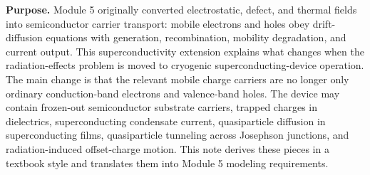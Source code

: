 \documentclass[11pt]{article}
\begin{document}

\begin{overviewbox}
\textbf{Purpose.} Module 5 originally converted electrostatic, defect, and thermal fields into semiconductor carrier transport: mobile electrons and holes obey drift-diffusion equations with generation, recombination, mobility degradation, and current output. This superconductivity extension explains what changes when the radiation-effects problem is moved to cryogenic superconducting-device operation. The main change is that the relevant mobile charge carriers are no longer only ordinary conduction-band electrons and valence-band holes. The device may contain frozen-out semiconductor substrate carriers, trapped charges in dielectrics, superconducting condensate current, quasiparticle diffusion in superconducting films, quasiparticle tunneling across Josephson junctions, and radiation-induced offset-charge motion. This note derives these pieces in a textbook style and translates them into Module 5 modeling requirements.
\end{overviewbox}

\ProjectTOC
\end{document}
